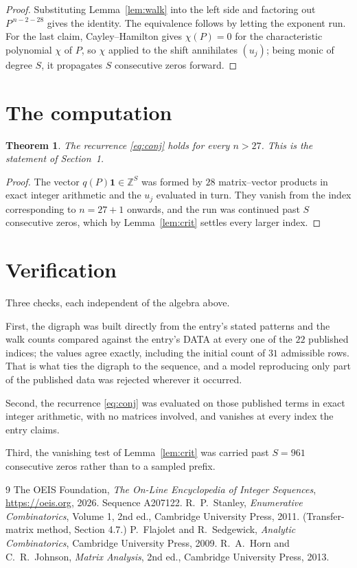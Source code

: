 \documentclass[11pt,a4paper]{article}
\theoremstyle{plain}
\newtheorem{theorem}{Theorem}
\theoremstyle{definition}
\begin{document}
\begin{proof}
Substituting Lemma~\ref{lem:walk} into the left side and factoring out
$P^{\,n-2-28}$ gives the identity. The equivalence follows by letting the exponent
run. For the last claim, Cayley--Hamilton gives $\chi(P)=0$ for the characteristic
polynomial $\chi$ of $P$, so $\chi$ applied to the shift annihilates $(u_j)$; being monic of
degree $S$, it propagates $S$ consecutive zeros forward.
\end{proof}

\section{The computation}

\begin{theorem}
The recurrence \eqref{eq:conj} holds for every $n>27$. This is the statement of
Section~1.
\end{theorem}

\begin{proof}
The vector $q(P)\mathbf{1}\in\mathbb{Z}^{S}$ was formed by $28$ matrix--vector
products in exact integer arithmetic and the $u_j$ evaluated in turn. They vanish from the
index corresponding to $n=27+1$ onwards, and the run was continued past $S$ consecutive
zeros, which by Lemma~\ref{lem:crit} settles every larger index.
\end{proof}

\section{Verification}

Three checks, each independent of the algebra above.

First, the digraph was built directly from the entry's stated patterns and the walk counts
compared against the entry's DATA at every one of the $22$ published indices; the
values agree exactly, including the initial count of $31$ admissible rows. That is
what ties the digraph to the sequence, and a model reproducing only part of the published
data was rejected wherever it occurred.

Second, the recurrence \eqref{eq:conj} was evaluated on those published terms in exact
integer arithmetic, with no matrices involved, and vanishes at every index the entry claims.

Third, the vanishing test of Lemma~\ref{lem:crit} was carried past $S=961$ consecutive
zeros rather than to a sampled prefix.

\begin{thebibliography}{9}
 The OEIS Foundation, \emph{The On-Line Encyclopedia of Integer
Sequences}, \url{https://oeis.org}, 2026. Sequence A207122.
 R.~P.~Stanley, \emph{Enumerative Combinatorics}, Volume 1, 2nd ed.,
Cambridge University Press, 2011. (Transfer-matrix method, Section 4.7.)
 P.~Flajolet and R.~Sedgewick, \emph{Analytic Combinatorics}, Cambridge
University Press, 2009.
 R.~A.~Horn and C.~R.~Johnson, \emph{Matrix Analysis}, 2nd ed., Cambridge
University Press, 2013.
\end{thebibliography}
\end{document}
